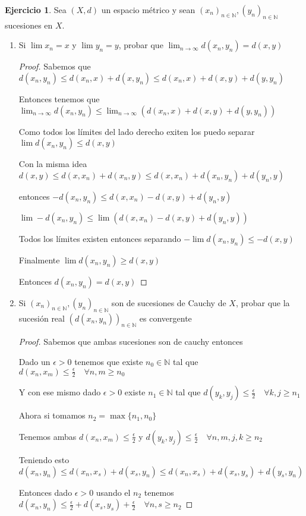 \documentclass[12pt]{article}
\newcommand{\N}{\mathbb{N}}
\newcommand{\ra}{\rightarrow}
\theoremstyle{definition}
\newtheorem{ej}{Ejercicio}
\begin{document}
\begin{ej}
  Sea $(X,d)$ un espacio métrico y sean $(x_n)_{n \in \N}, (y_n)_{n \in \N}$ sucesiones en $X$.
  \begin{enumerate}
    \item Si $\lim x_n = x$ y $\lim y_n = y$, probar que $\lim_{n \ra \infty} d(x_n,y_n) = d(x,y)$ 
      \begin{proof}
	Sabemos que $d(x_n , y_n) \leq d(x_n,x) + d(x,y_n) \leq d(x_n,x) + d(x,y) + d(y,y_n)$

	Entonces tenemos que $\lim_{n \ra \infty} d(x_n,y_n) \leq \lim_{n \ra \infty}{(d(x_n,x) + d(x,y) + d(y,y_n))}$

	Como todos los límites del lado derecho exiten los puedo separar $\lim d(x_n,y_n) \leq d(x,y)$

	Con la misma idea $d(x,y) \leq d(x,x_n) + d(x_n,y) \leq d(x,x_n) + d(x_n,y_n) + d(y_n ,y)$

	entonces $- d(x_n,y_n) \leq d(x,x_n) - d(x,y) + d(y_n,y)$

	$\lim - d(x_n,y_n) \leq \lim (d(x,x_n) - d(x,y) + d(y_n,y)) $ 

	Todos los límites existen entonces separando $-\lim d(x_n,y_n) \leq -d(x,y)$

	Finalmente $\lim d(x_n,y_n) \geq d(x,y)$

	Entonces $d(x_n,y_n) = d(x,y)$
      \end{proof}
      \newpage
    \item Si $(x_n)_{n \in \N}, (y_n)_{n \in \N}$ son de sucesiones de Cauchy de $X$, probar que la sucesión real $(d(x_n,y_n))_{n \in \N}$ es convergente
      \begin{proof}
	Sabemos que ambas sucesiones son de cauchy entonces 

	Dado un $\epsilon > 0$ tenemos que existe $n_0 \in \N$ tal que $d(x_n,x_m) \leq \frac{\epsilon}{2} \quad \forall n,m \geq n_0$

	Y con ese mismo dado $\epsilon > 0$ existe $n_1\in \N$ tal que $d(y_k,y_j) \leq \frac{\epsilon}{2} \quad \forall k,j\geq n_1 $

	Ahora si tomamos $n_2 = \max{\{n_1 ,n_0\}}$

	Tenemos ambas $d(x_n,x_m) \leq \frac{\epsilon}{2}$ y $d(y_k,y_j) \leq \frac{\epsilon}{2} \quad \forall n,m,j,k \geq n_2$


	Teniendo esto $d(x_n,y_n) \leq d(x_n ,x_{s}) + d(x_{s},y_n) \leq d(x_n,x_{s}) + d(x_{s},y_{s}) + d(y_{s},y_n)$

	Entonces dado $\epsilon > 0$ usando el $n_2$ tenemos $d(x_n,y_n) \leq \frac{\epsilon}{2} + d(x_s,y_s) + \frac{\epsilon}{2} \quad \forall n,s \geq n_2$


\end{proof}
\end{enumerate}
\end{ej}
\end{document}
